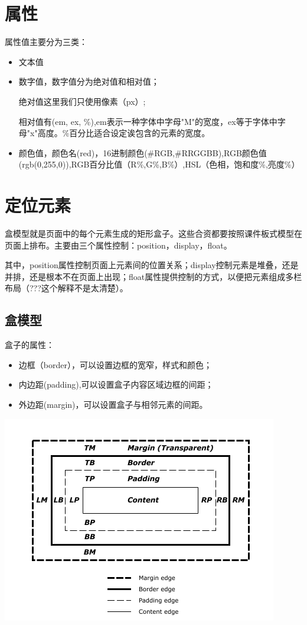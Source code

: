 \section{属性}

属性值主要分为三类：

\begin{itemize}
\item 文本值
\item 数字值，数字值分为绝对值和相对值；

绝对值这里我们只使用像素（px）;

相对值有(em, ex, \%),em表示一种字体中字母"M"的宽度，ex等于字体中字母"x"高度。\%百分比适合设定诶包含的元素的宽度。

\item 颜色值，颜色名(red)，16进制颜色(\#RGB,\#RRGGBB),RGB颜色值(rgb(0,255,0)),RGB百分比值（R\%,G\%,B\%）,HSL（色相，饱和度\%,亮度\%）
\end{itemize}


\section{定位元素}

盒模型就是页面中的每个元素生成的矩形盒子。这些合资都要按照课件板式模型在页面上排布。主要由三个属性控制：position，display，float。

其中，position属性控制页面上元素间的位置关系；display控制元素是堆叠，还是并排，还是根本不在页面上出现；float属性提供控制的方式，以便把元素组成多栏布局（???这个解释不是太清楚）。

\subsection{盒模型}

盒子的属性：
\begin{itemize}
\item 边框（border），可以设置边框的宽窄，样式和颜色；
\item 内边距(padding),可以设置盒子内容区域边框的间距；
\item 外边距(margin)，可以设置盒子与相邻元素的间距。
\end{itemize}

\includegraphics[scale=1]{css/resources/box-mode.png}


